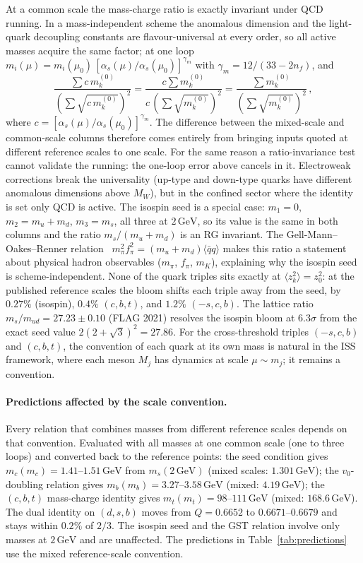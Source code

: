 \documentclass[12pt,a4paper]{article}
\newcommand{\GeV}{\,\text{GeV}}
\begin{document}
At a common scale the mass-charge ratio is exactly invariant under QCD
running. In a mass-independent scheme the anomalous dimension and the
light-quark decoupling constants are flavour-universal at every order,
so all active masses acquire the same factor; at one loop
$m_i(\mu) = m_i(\mu_0)\,[\alpha_s(\mu)/\alpha_s(\mu_0)]^{\gamma_m}$ with
$\gamma_m = 12/(33 - 2n_f)$, and
\begin{equation}
  \frac{\sum c\,m_k^{(0)}}{(\sum \sqrt{c\,m_k^{(0)}})^2}
  = \frac{c\sum m_k^{(0)}}{c\,(\sum\sqrt{m_k^{(0)}})^2}
  = \frac{\sum m_k^{(0)}}{(\sum\sqrt{m_k^{(0)}})^2}\,,
\end{equation}
where $c = [\alpha_s(\mu)/\alpha_s(\mu_0)]^{\gamma_m}$. The difference
between the mixed-scale and common-scale columns therefore comes entirely
from bringing inputs quoted at different reference scales to one scale.
For the same reason a ratio-invariance test cannot validate the running:
the one-loop error above cancels in it. Electroweak corrections break the
universality (up-type and down-type quarks have different anomalous
dimensions above $M_W$), but in the confined sector where the identity is
set only QCD is active.
The isospin seed is a special case: $m_1 = 0$, $m_2 = m_u{+}m_d$, $m_3 = m_s$,
all three at $2\GeV$, so its value is the same in both columns and
the ratio $m_s/(m_u{+}m_d)$ is an RG invariant.
The Gell-Mann--Oakes--Renner relation~\cite{GOR1968}
$m_\pi^2 f_\pi^2 = (m_u{+}m_d)\langle\bar qq\rangle$
makes this ratio a statement about physical hadron observables
($m_\pi$, $f_\pi$, $m_K$), explaining why the isospin seed
is scheme-independent.
None of the quark triples sits exactly at $\langle z_k^2\rangle = z_0^2$:
at the published reference scales
the bloom shifts each triple away from the seed,
by $0.27\%$ (isospin), $0.4\%$ $(c,b,t)$, and $1.2\%$ $(-s,c,b)$.
The lattice ratio $m_s/m_{ud} = 27.23 \pm 0.10$ (FLAG 2021)
resolves the isospin bloom at $6.3\sigma$ from the
exact seed value $2(2{+}\sqrt{3})^2 = 27.86$.
For the cross-threshold triples $(-s,c,b)$ and $(c,b,t)$,
the convention of each quark at its own mass is
natural in the ISS framework, where each meson $M_j$ has dynamics
at scale $\mu \sim m_j$; it remains a convention.

\paragraph{Predictions affected by the scale convention.}
Every relation that combines masses from different reference scales
depends on that convention. Evaluated with all masses at one common
scale (one to three loops) and converted back to the reference points:
the seed condition gives $m_c(m_c) = 1.41$--$1.51\GeV$ from
$m_s(2\GeV)$ (mixed scales: $1.301\GeV$); the $v_0$-doubling relation
gives $m_b(m_b) = 3.27$--$3.58\GeV$ (mixed: $4.19\GeV$); the $(c,b,t)$
mass-charge identity gives $m_t(m_t) = 98$--$111\GeV$ (mixed:
$168.6\GeV$). The dual identity on $(d,s,b)$ moves from $Q = 0.6652$ to
$0.6671$--$0.6679$ and stays within $0.2\%$ of $2/3$. The isospin seed
and the GST relation involve only masses at $2\GeV$ and are unaffected.
The predictions in Table~\ref{tab:predictions} use the mixed
reference-scale convention.
\end{document}
